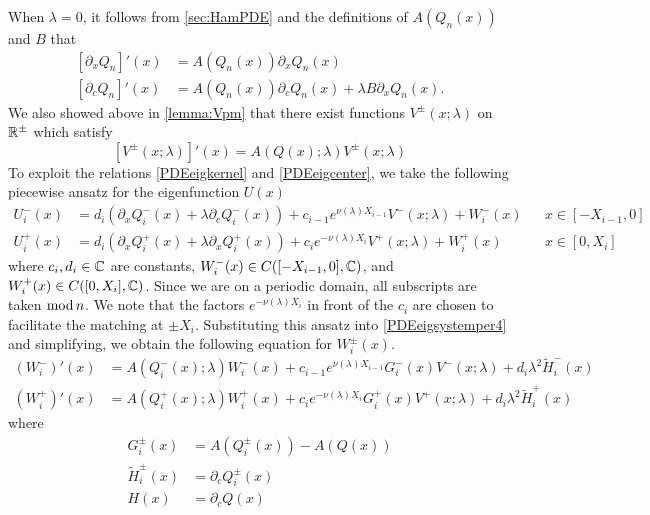 \documentclass[thesis.tex]{subfiles}
\begin{document}
When $\lambda = 0$, it follows from \cref{sec:HamPDE} and the definitions of $A(Q_n(x))$ and $B$ that 
\begin{equation}\label{PDEeigkernel}
\begin{aligned}
{[\partial_x Q_n]}'(x) &= A(Q_n(x))\partial_x Q_n(x) \\
{[\partial_c Q_n]}'(x) &= A(Q_n(x))\partial_c Q_n(x) + \lambda B \partial_x Q_n(x).
\end{aligned}
\end{equation}
We also showed above in \cref{lemma:Vpm} that there exist functions $V^\pm(x; \lambda)$ on $\mathbb{R}^\pm$ which satisfy
\begin{equation}\label{PDEeigcenter}
[V^\pm(x; \lambda)]'(x) = A(Q(x); \lambda) V^\pm(x; \lambda)
\end{equation}
To exploit the relations \eqref{PDEeigkernel} and \eqref{PDEeigcenter}, we take the following piecewise ansatz for the eigenfunction $U(x)$
\begin{equation}\label{Vpiecewise}
\begin{aligned}
U_i^-(x) &= d_i (\partial_x Q_i^-(x) + \lambda \partial_c Q_i^-(x)) + c_{i-1} e^{\nu(\lambda)X_{i-1} } V^-(x; \lambda) + W_i^-(x) && x \in [-X_{i-1}, 0] \\
U_i^+(x) &= d_i (\partial_x Q_i^+(x) + \lambda \partial_x Q_i^+(x)) + c_i e^{-\nu(\lambda)X_i }V^+(x; \lambda) + W_i^+(x) && x \in [0, X_i] 
\end{aligned}
\end{equation}
where $c_i, d_i \in \mathbb{C}$ are constants, $W_i^-(x) \in C([-X_{i-1}, 0], \mathbb{C})$, and $W_i^+(x) \in C([0, X_i], \mathbb{C})$. Since we are on a periodic domain, all subscripts are taken $\mathop\mathrm{mod}\nolimits n$. We note that the factors $e^{-\nu(\lambda)X_i }$ in front of the $c_i$ are chosen to facilitate the matching at $\pm X_i$. Substituting this ansatz into \cref{PDEeigsystemper4} and simplifying, we obtain the following equation for $W_i^\pm(x)$.
\begin{equation}\label{Wipm2}
\begin{aligned}
(W_i^-)'(x) &= A(Q_i^-(x); \lambda) W_i^-(x) + c_{i-1} e^{\nu(\lambda)X_{i-1}} G_i^-(x)V^-(x; \lambda) + d_i \lambda^2 \tilde{H}_i^-(x) \\
(W_i^+)'(x) &= A(Q_i^+(x); \lambda) W_i^+(x) + c_i e^{-\nu(\lambda)X_i } G_i^+(x)V^+(x; \lambda) + d_i \lambda^2 \tilde{H}_i^+(x)
\end{aligned}
\end{equation}
where
\begin{align*}
G_i^\pm(x) &= A(Q_i^\pm(x)) - A(Q(x)) \\
\tilde{H}_i^\pm(x) &= \partial_c Q_i^\pm(x) \\ 
H(x) &= \partial_c Q(x)
\end{align*}
\end{document}
